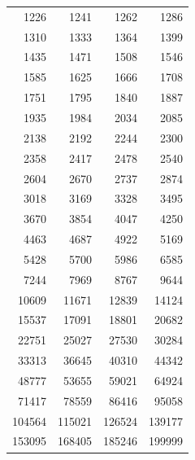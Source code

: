 \begin{center}\begin{tabular}{rrrr}\toprule
1226 & 1241 & 1262 & 1286 \\
1310 & 1333 & 1364 & 1399 \\
1435 & 1471 & 1508 & 1546 \\
1585 & 1625 & 1666 & 1708 \\
1751 & 1795 & 1840 & 1887 \\
1935 & 1984 & 2034 & 2085 \\
2138 & 2192 & 2244 & 2300 \\
2358 & 2417 & 2478 & 2540 \\
2604 & 2670 & 2737 & 2874 \\
3018 & 3169 & 3328 & 3495 \\
3670 & 3854 & 4047 & 4250 \\
4463 & 4687 & 4922 & 5169 \\
5428 & 5700 & 5986 & 6585 \\
7244 & 7969 & 8767 & 9644 \\
10609 & 11671 & 12839 & 14124 \\
15537 & 17091 & 18801 & 20682 \\
22751 & 25027 & 27530 & 30284 \\
33313 & 36645 & 40310 & 44342 \\
48777 & 53655 & 59021 & 64924 \\
71417 & 78559 & 86416 & 95058 \\
104564 & 115021 & 126524 & 139177 \\
153095 & 168405 & 185246 & 199999 \\
\bottomrule\end{tabular}\end{center}
